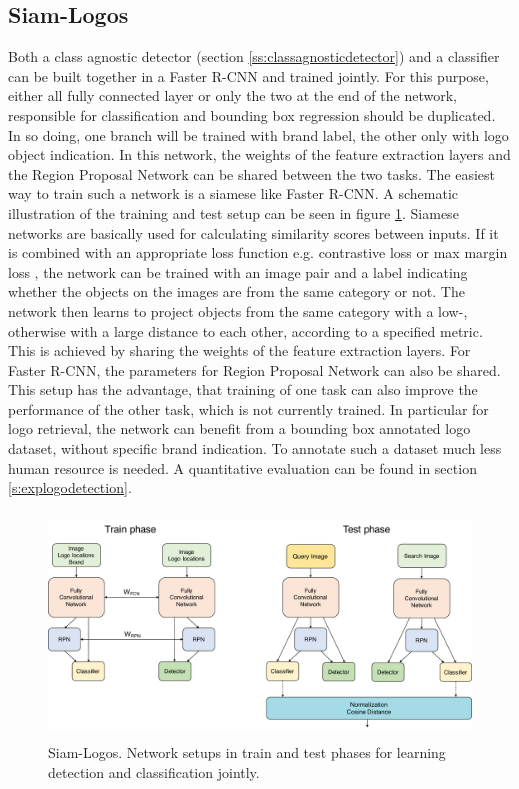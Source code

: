 \subsection{Siam-Logos}\label{ss:solution5}
Both a class agnostic detector (section \ref{ss:classagnosticdetector}) and a classifier can be built together in a Faster R-CNN and trained jointly. For this purpose, either all fully connected layer or only the two at the end of the network, responsible for classification and bounding box regression should be duplicated. In so doing, one branch will be trained with brand label, the other only with logo object indication. In this network, the weights of the feature extraction layers and the Region Proposal Network can be shared between the two tasks. The easiest way to train such a network is a siamese like Faster R-CNN. A schematic illustration of the training and test setup can be seen in figure \ref{f:jointlearning}.
\bigbreak
Siamese networks \cite{Hadsell06dimensionalityreduction} are basically used for calculating similarity scores between inputs. If it is combined with an appropriate loss function e.g. contrastive loss \cite{Hadsell06dimensionalityreduction} or max margin loss \cite{Simonyan13}\cite{ies_2016_herrmann_low_quality}, the network can be trained with an image pair and a label indicating whether the objects on the images are from the same category or not. The network then learns to project objects from the same category with a low-, otherwise with a large distance to each other, according to a specified metric. This is achieved by sharing the weights of the feature extraction layers.
\bigbreak
For Faster R-CNN, the parameters for Region Proposal Network can also be shared. This setup has the advantage, that training of one task can also improve the performance of the other task, which is not currently trained. In particular for logo retrieval, the network can benefit from a bounding box annotated logo dataset, without specific brand indication. To annotate such a dataset much less human resource is needed. A quantitative evaluation can be found in section \ref{s:explogodetection}.
\begin{figure}
  \centering
  \includegraphics[height=60mm]{images/mt/sol5_arch.pdf}
\caption{Siam-Logos. Network setups in train and test phases for learning detection and classification jointly.}
\label{f:jointlearning}
\end{figure}

